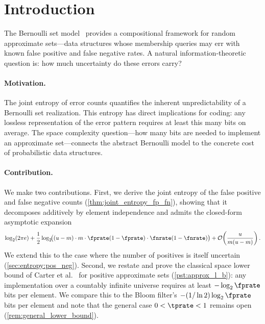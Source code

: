 \section{Introduction}
\label{sec:intro_ent}

The Bernoulli set model~\cite{bernoulliSets} provides a compositional framework
for random approximate sets---data structures whose membership queries may err
with known false positive and false negative rates.
A natural information-theoretic question is: how much uncertainty do these
errors carry?

\paragraph{Motivation.}
The joint entropy of error counts quantifies the inherent unpredictability of a
Bernoulli set realization.
This entropy has direct implications for coding: any lossless representation of
the error pattern requires at least this many bits on average.
The space complexity question---how many bits are needed to implement an
approximate set---connects the abstract Bernoulli model to the concrete cost of
probabilistic data structures.

\paragraph{Contribution.}
We make two contributions.
First, we derive the joint entropy of the false positive and false negative
counts (\cref{thm:joint_entropy_fp_fn}), showing that it decomposes additively
by element independence and admits the closed-form asymptotic expansion
\begin{equation}
    \log_2(2\pi e)
    + \frac{1}{2}\log_2\!\bigl(
        (u-m) \cdot m \cdot \fprate(1-\fprate) \cdot \fnrate(1-\fnrate)
      \bigr)
    + \mathcal{O}\!\left(\frac{u}{m(u-m)}\right).
\end{equation}
We extend this to the case where the number of positives is itself uncertain
(\cref{sec:entropy:pos_neg}).
Second, we restate and prove the classical space lower bound of Carter et
al.~\cite{carterExact} for positive approximate sets
(\cref{pst:approx_l_b}): any implementation over a countably infinite universe
requires at least $-\log_2 \fprate$ bits per element.
We compare this to the Bloom filter's $-(1/\ln 2)\log_2\fprate$ bits per
element and note that the general case $0 < \tprate < 1$ remains open
(\cref{rem:general_lower_bound}).

